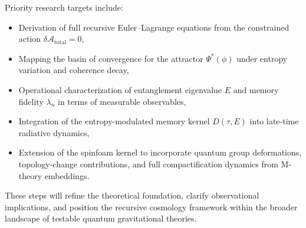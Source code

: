 Priority research targets include:

\begin{itemize}
  \item Derivation of full recursive Euler–Lagrange equations from the constrained action \( \delta \mathcal{A}_{\text{total}} = 0 \),
  \item Mapping the basin of convergence for the attractor \( \Psi^*(\phi) \) under entropy variation and coherence decay,
  \item Operational characterization of entanglement eigenvalue \( E \) and memory fidelity \( \lambda_n \) in terms of measurable observables,
  \item Integration of the entropy-modulated memory kernel \( D(\tau, E) \) into late-time radiative dynamics,
  \item Extension of the spinfoam kernel to incorporate quantum group deformations, topology-change contributions, and full compactification dynamics from M-theory embeddings.
\end{itemize}

These steps will refine the theoretical foundation, clarify observational implications, and position the recursive cosmology framework within the broader landscape of testable quantum gravitational theories.
